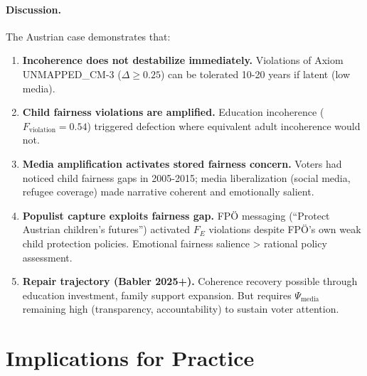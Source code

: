\paragraph{Discussion.}

The Austrian case demonstrates that:
\begin{enumerate}
\item \textbf{Incoherence does not destabilize immediately.} Violations of Axiom UNMAPPED_CM-3 ($\Delta \geq 0.25$)
can be tolerated 10-20 years if latent (low media).

\item \textbf{Child fairness violations are amplified.} Education incoherence ($F_{\text{violation}} = 0.54$)
triggered defection where equivalent adult incoherence would not.

\item \textbf{Media amplification activates stored fairness concern.} Voters had noticed child
fairness gaps in 2005-2015; media liberalization (social media, refugee coverage) made narrative
coherent and emotionally salient.

\item \textbf{Populist capture exploits fairness gap.} FPÖ messaging (``Protect Austrian children's
futures'') activated $F_E$ violations despite FPÖ's own weak child protection policies. Emotional
fairness salience > rational policy assessment.

\item \textbf{Repair trajectory (Babler 2025+).} Coherence recovery possible through education
investment, family support expansion. But requires $\Psi_{\text{media}}$ remaining high
(transparency, accountability) to sustain voter attention.

\end{enumerate}

\section{Implications for Practice}
\label{sec:cm-practice}

